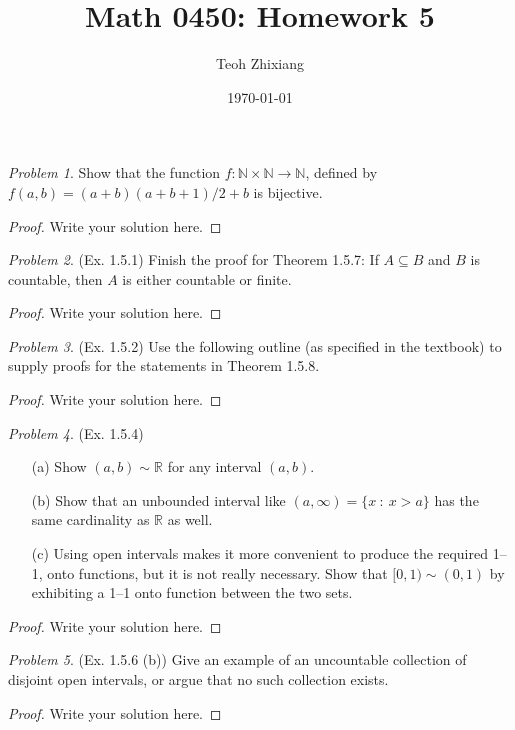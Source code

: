 \documentclass[11pt,twoside, reqno]{amsart}
\theoremstyle{remark}
\newtheorem{Prob}{Problem}
\def\R{\mathbb R}
\def\N{\mathbb N}
\begin{document}
\title{Math 0450: Homework 5}
\date{\today}
\author{Teoh Zhixiang}

\maketitle



\begin{Prob}
Show that the function $f:\N\times \N\to \N$, defined by $f(a,b)=(a+b)(a+b+1)/2+b$ is bijective. 

\end{Prob}

\begin{proof}
Write your solution here.

\end{proof}

\begin{Prob}(Ex. 1.5.1) Finish the proof for Theorem 1.5.7: If $A\subseteq B$ and $B$ is countable, then $A$ is either countable or finite.
\end{Prob}

\begin{proof}
Write your solution here.

\end{proof}


\begin{Prob}(Ex. 1.5.2) Use the following outline (as specified in the textbook) to supply proofs for the statements in Theorem 1.5.8.
\end{Prob}

\begin{proof}
Write your solution here.

\end{proof}


\begin{Prob}(Ex. 1.5.4) \begin{enumerate}
\item[(a)] Show $(a, b) \sim \R$ for any interval $(a, b)$.
\item[(b)] Show that an unbounded interval like $(a, \infty) = \{x~ :~ x > a\}$ has the same cardinality as $\R$ as well.
\item[(c)] Using open intervals makes it more convenient to produce the required 1--1, onto functions, but it is not really necessary. Show that $[0, 1)\sim (0, 1)$ by exhibiting a 1--1 onto function between the two sets.
\end{enumerate}
\end{Prob}

\begin{proof}
Write your solution here.

\end{proof}

\begin{Prob}(Ex. 1.5.6 (b)) Give an example of an uncountable collection of disjoint open intervals, or argue that no such collection exists.
\end{Prob}

\begin{proof}
Write your solution here.

\end{proof}
\end{document}

